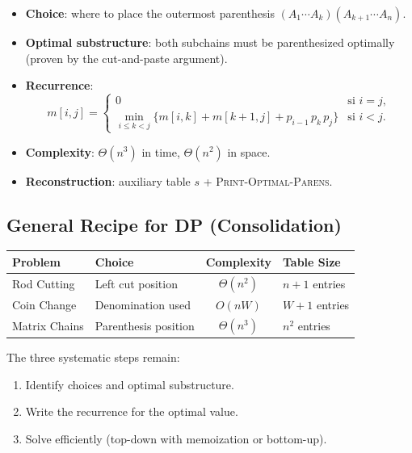 \begin{tcolorbox}[colback=lightblue, colframe=keyblue, fonttitle=\bfseries,
                  title={Summary DP – Matrix Chain Multiplication}]
\begin{itemize}[noitemsep]
  \item \textbf{Choice}: where to place the outermost parenthesis
        $(A_1 \cdots A_k)(A_{k+1} \cdots A_n)$.
  \item \textbf{Optimal substructure}: both subchains must be
        parenthesized optimally (proven by the cut-and-paste argument).
  \item \textbf{Recurrence}:
    \[
      m[i,j] =
      \begin{cases}
        0 & \text{si } i = j, \\
        \displaystyle\min_{i \le k < j}
          \bigl\{m[i,k] + m[k+1,j] + p_{i-1}\,p_k\,p_j\bigr\}
        & \text{si } i < j.
      \end{cases}
    \]
  \item \textbf{Complexity}: $\Theta(n^3)$ in time, $\Theta(n^2)$ in space.
  \item \textbf{Reconstruction}: auxiliary table $s$ + \textsc{Print-Optimal-Parens}.
\end{itemize}
\end{tcolorbox}

\subsection{General Recipe for DP (Consolidation)}

\begin{center}
\renewcommand{\arraystretch}{1.45}
\begin{tabular}{llcl}
\toprule
\textbf{Problem} & \textbf{Choice} & \textbf{Complexity} & \textbf{Table Size} \\
\midrule
Rod Cutting      & Left cut position      & $\Theta(n^2)$   & $n+1$ entries \\
Coin Change      & Denomination used       & $O(nW)$         & $W+1$ entries \\
Matrix Chains    & Parenthesis position  & $\Theta(n^3)$   & $n^2$ entries \\
\bottomrule
\end{tabular}
\end{center}

The three systematic steps remain:
\begin{enumerate}
  \item Identify choices and optimal substructure.
  \item Write the recurrence for the optimal value.
  \item Solve efficiently (top-down with memoization or bottom-up).
\end{enumerate}
